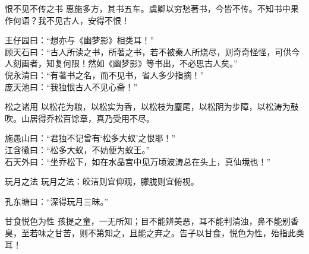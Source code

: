 \begin{yulu}{恨不见不传之书}
惠施多方，其书五车。虞卿以穷愁著书，今皆不传。不知书中果作何语？我不见古人，安得不恨！
\begin{comments}
王仔园曰：“想亦与《幽梦影》相类耳！” \\
顾天石曰：“古人所读之书，所著之书，若不被秦人所烧尽，则奇奇怪怪，可供今人刻画者，知复何限！然如《幽梦影》等书出，不必思古人矣。” \\
倪永清曰：“有著书之名，而不见书，省人多少指摘！” \\
庞天池曰：“我独恨古人不见心斋！”
\end{comments}
\end{yulu}

\begin{yulu}{松之诸用}
以松花为粮，以松实为香，以松枝为麈尾，以松阴为步障，以松涛为鼓吹。山居得乔松百馀章，真乃受用不尽。
\begin{comments}
施愚山曰：“君独不记曾有‘松多大蚁’之恨耶！” \\
江含徵曰：“松多大蚁，不妨便为蚁王。” \\
石天外曰：“坐乔松下，如在水晶宫中见万顷波涛总在头上，真仙境也！”
\end{comments}
\end{yulu}

\begin{yulu}{玩月之法}
玩月之法：皎洁则宜仰观，朦胧则宜俯视。
\begin{comments}
孔东塘曰：“深得玩月三昧。”
\end{comments}
\end{yulu}

\begin{yulu}{甘食悦色为性}
孩提之童，一无所知；目不能辨美恶，耳不能判清浊，鼻不能别香臭，至若味之甘苦，则不第知之，且能之弃之。告子以甘食，悦色为性，殆指此类耳！
\begin{comments}

\end{comments}
\end{yulu}

\begin{yulu}{}

\begin{comments}

\end{comments}
\end{yulu}

\begin{yulu}{}

\begin{comments}

\end{comments}
\end{yulu}

